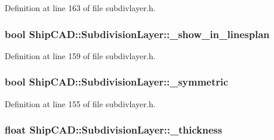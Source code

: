 Definition at line 163 of file subdivlayer.\-h.

\hypertarget{classShipCAD_1_1SubdivisionLayer_a373fd987b5f973a995517e7f97fda5ac}{
\subsubsection[{\-\_\-show\-\_\-in\-\_\-linesplan}]{\setlength{\rightskip}{0pt plus 5cm}bool Ship\-C\-A\-D\-::\-Subdivision\-Layer\-::\-\_\-show\-\_\-in\-\_\-linesplan\hspace{0.3cm}{\ttfamily [protected]}}}\label{classShipCAD_1_1SubdivisionLayer_a373fd987b5f973a995517e7f97fda5ac}


Definition at line 159 of file subdivlayer.\-h.

\hypertarget{classShipCAD_1_1SubdivisionLayer_aaeddcdf1d08d84c76c5453f4a71fbe7a}{
\subsubsection[{\-\_\-symmetric}]{\setlength{\rightskip}{0pt plus 5cm}bool Ship\-C\-A\-D\-::\-Subdivision\-Layer\-::\-\_\-symmetric\hspace{0.3cm}{\ttfamily [protected]}}}\label{classShipCAD_1_1SubdivisionLayer_aaeddcdf1d08d84c76c5453f4a71fbe7a}


Definition at line 155 of file subdivlayer.\-h.

\hypertarget{classShipCAD_1_1SubdivisionLayer_a00a308fdf03a0c1d9a6fa65f965e7942}{
\subsubsection[{\-\_\-thickness}]{\setlength{\rightskip}{0pt plus 5cm}float Ship\-C\-A\-D\-::\-Subdivision\-Layer\-::\-\_\-thickness\hspace{0.3cm}{\ttfamily [protected]}}}\label{classShipCAD_1_1SubdivisionLayer_a00a308fdf03a0c1d9a6fa65f965e7942}


